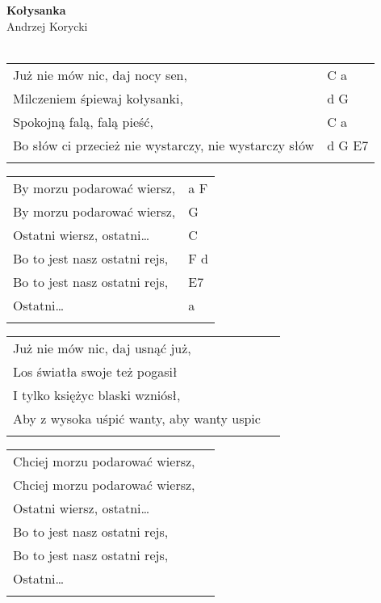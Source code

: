 \documentclass[a5paper]{article}
\begin{document}


\noindent
\fontsize{12pt}{15pt}\selectfont
\textbf{Kołysanka} \\
\fontsize{8pt}{10pt}\selectfont
Andrzej Korycki \\ \\
\fontsize{10pt}{12pt}\selectfont
{}
\begin{tabular}{@{}p{9.00cm}p{3cm}@{}}
\noindent
Już nie mów nic, daj nocy sen, & C a \\
Milczeniem śpiewaj kołysanki, & d G \\
Spokojną falą, falą pieść, & C a \\
Bo słów ci przecież nie wystarczy, nie wystarczy słów & d G E7 \\ \\
\end{tabular}

\noindent
\begin{tabular}{@{}p{8.00cm}p{3cm}@{}}
	By morzu podarować wiersz, & a F \\
	By morzu podarować wiersz, & G \\
	Ostatni wiersz, ostatni… & C \\
	Bo to jest nasz ostatni rejs, & F d \\
	Bo to jest nasz ostatni rejs, & E7 \\
	Ostatni… & a \\ \\
\end{tabular}

\noindent
\begin{tabular}{@{}p{8.00cm}p{3cm}@{}}
Już nie mów nic, daj usnąć już,	\\
Los światła swoje też pogasił \\
I tylko księżyc blaski wzniósł,	\\
Aby z wysoka uśpić wanty, aby wanty uspic\\ \\
\end{tabular}

\noindent
\begin{tabular}{@{}p{8.00cm}p{3cm}@{}}
Chciej morzu podarować wiersz, \\
Chciej morzu podarować wiersz, \\
Ostatni wiersz, ostatni… \\
Bo to jest nasz ostatni rejs, \\
Bo to jest nasz ostatni rejs, \\
Ostatni… \\ \\
\end{tabular}
\end{document}
